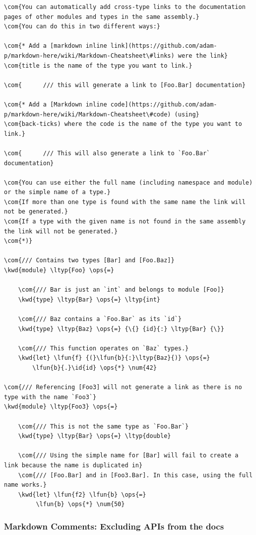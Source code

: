 \documentclass{article}
\newcommand{\id}[1]{\textcolor{black}{#1}}
\newcommand{\com}[1]{\textcolor{officegreen}{#1}}
\newcommand{\kwd}[1]{\textcolor{navy}{#1}}
\newcommand{\num}[1]{\textcolor{officegreen}{#1}}
\newcommand{\ops}[1]{\textcolor{purple}{#1}}
\begin{document}
\begin{Verbatim}[commandchars=\\\{\}]
\com{You can automatically add cross-type links to the documentation pages of other modules and types in the same assembly.}
\com{You can do this in two different ways:}

\com{* Add a [markdown inline link](https://github.com/adam-p/markdown-here/wiki/Markdown-Cheatsheet\#links) were the link}
\com{title is the name of the type you want to link.}

\com{      /// this will generate a link to [Foo.Bar] documentation}

\com{* Add a [Markdown inline code](https://github.com/adam-p/markdown-here/wiki/Markdown-Cheatsheet\#code) (using}
\com{back-ticks) where the code is the name of the type you want to link.}

\com{      /// This will also generate a link to `Foo.Bar` documentation}

\com{You can use either the full name (including namespace and module) or the simple name of a type.}
\com{If more than one type is found with the same name the link will not be generated.}
\com{If a type with the given name is not found in the same assembly the link will not be generated.}
\com{*)}

\com{/// Contains two types [Bar] and [Foo.Baz]}
\kwd{module} \ltyp{Foo} \ops{=}

    \com{/// Bar is just an `int` and belongs to module [Foo]}
    \kwd{type} \ltyp{Bar} \ops{=} \ltyp{int}

    \com{/// Baz contains a `Foo.Bar` as its `id`}
    \kwd{type} \ltyp{Baz} \ops{=} {\{} {id}{:} \ltyp{Bar} {\}}

    \com{/// This function operates on `Baz` types.}
    \kwd{let} \lfun{f} {(}\lfun{b}{:}\ltyp{Baz}{)} \ops{=}
        \lfun{b}{.}\id{id} \ops{*} \num{42}

\com{/// Referencing [Foo3] will not generate a link as there is no type with the name `Foo3`}
\kwd{module} \ltyp{Foo3} \ops{=}

    \com{/// This is not the same type as `Foo.Bar`}
    \kwd{type} \ltyp{Bar} \ops{=} \ltyp{double}

    \com{/// Using the simple name for [Bar] will fail to create a link because the name is duplicated in}
    \com{/// [Foo.Bar] and in [Foo3.Bar]. In this case, using the full name works.}
    \kwd{let} \lfun{f2} \lfun{b} \ops{=}
         \lfun{b} \ops{*} \num{50}
\end{Verbatim}

\subsubsection*{Markdown Comments: Excluding APIs from the docs}
\end{document}
